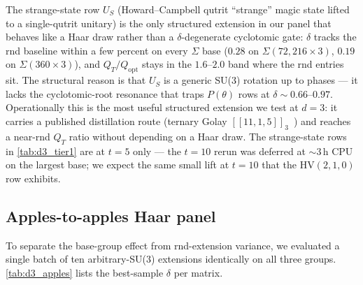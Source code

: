 \documentclass[twocolumn,superscriptaddress,showpacs,nofootinbib,notitlepage,preprintnumbers,secnumarabic,amssymb, nobibnotes, aps, prd]{revtex4-2}
\newcommand{\QT}{Q_{T}}              %
\newcommand{\Popt}{Q_{\mathrm{opt}}} %
\newcommand{\HV}[3]{\mathrm{HV}(#1,#2,#3)} %
\newcommand{\Sigmathree}[1]{\Sigma(#1\!\times\!3)} %
\begin{document}
The strange-state row $U_S$ (Howard--Campbell qutrit ``strange'' magic state lifted to a single-qutrit unitary) is the only structured extension in our panel that behaves like a Haar draw rather than a $\delta$-degenerate cyclotomic gate: $\delta$ tracks the rnd baseline within a few percent on every $\Sigma$ base ($0.28$ on $\Sigmathree{72,216}$, $0.19$ on $\Sigmathree{360}$), and $\QT/\Popt$ stays in the $1.6$--$2.0$ band where the rnd entries sit. The structural reason is that $U_S$ is a generic SU(3) rotation up to phases --- it lacks the cyclotomic-root resonance that traps $P(\theta)$ rows at $\delta\sim\!0.66$--$0.97$. Operationally this is the most useful structured extension we test at $d=3$: it carries a published distillation route (ternary Golay $[[11,1,5]]_3$~\cite{Prakash:2020lowoverhead}) and reaches a near-rnd $\QT$ ratio without depending on a Haar draw. The strange-state rows in \cref{tab:d3_tier1} are at $t=5$ only --- the $t=10$ rerun was deferred at $\sim$3\,h CPU on the largest base; we expect the same small lift at $t=10$ that the $\HV{2}{1}{0}$ row exhibits.

\subsection{Apples-to-apples Haar panel}\label{sec:d3_apples}

To separate the base-group effect from rnd-extension variance, we evaluated a single batch of ten arbitrary-SU(3) extensions identically on all three groups. \cref{tab:d3_apples} lists the best-sample $\delta$ per matrix.
\end{document}
